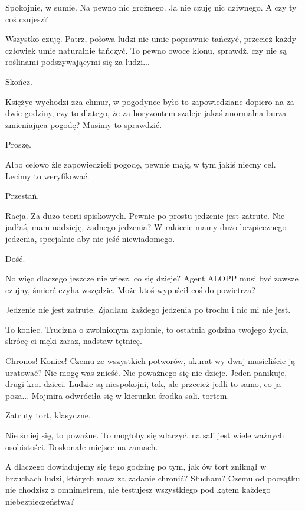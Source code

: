 \ds{} Spokojnie, w sumie. Na pewno nic groźnego. Ja nie czuję nic dziwnego. A czy ty coś czujesz? \de{}

\ds{} Wszystko czuję. Patrz, połowa ludzi nie umie poprawnie tańczyć, przecież każdy człowiek umie naturalnie tańczyć.
To pewno owoce klonu, sprawdź, czy nie są roślinami podszywającymi się za ludzi... \de{}

\ds{} Skończ. \de{}

\ds{} Księżyc wychodzi zza chmur, w pogodynce było to zapowiedziane dopiero na za dwie godziny, czy to dlatego, że za horyzontem szaleje jakaś anormalna burza zmieniająca pogodę? Musimy to sprawdzić. \de{}

\ds{} Proszę. \de{}

\ds{} Albo celowo źle zapowiedzieli pogodę, pewnie mają w tym jakiś niecny cel. Lecimy to weryfikować. \de{}

\ds{} Przestań. \de{}

\ds{} Racja. Za dużo teorii spiskowych. Pewnie po prostu jedzenie jest zatrute. Nie jadłaś, mam nadzieję, żadnego jedzenia? 
W rakiecie mamy dużo bezpiecznego jedzenia, specjalnie aby nie jeść niewiadomego. \de{}

\ds{} Dość. 

\ds{} No więc dlaczego jeszcze nie wiesz, co się dzieje? 
Agent ALOPP musi być zawsze czujny, śmierć czyha wszędzie. Może ktoś wypuścił coś do powietrza? \de{}

\ds{} Jedzenie nie jest zatrute. Zjadłam każdego jedzenia po trochu i nic mi nie jest. \de{}

\ds{} To koniec. Trucizna o zwolnionym zapłonie, to ostatnia godzina twojego życia, skrócę ci męki zaraz, nadstaw tętnicę. \de{}

\ds{} Chronos! Koniec! Czemu ze wszystkich potworów, akurat wy dwaj musieliście ją uratować? Nie mogę was znieść. Nic poważnego się nie dzieje. 
Jeden panikuje, drugi kroi dzieci.
Ludzie są niespokojni, tak, ale przecież jedli to samo, co ja poza...
\dm{} Mojmira odwróciła się w kierunku środka sali. \dm{} tortem. \de{}

\ds{} Zatruty tort, klasyczne. \de{}

\ds{} Nie śmiej się, to poważne. To mogłoby się zdarzyć, na sali jest wiele ważnych osobistości. Doskonałe miejsce na zamach. \de{}

\ds{} A dlaczego dowiadujemy się tego godzinę po tym, jak ów tort zniknął w brzuchach ludzi, których masz za zadanie chronić? Słucham? 
Czemu od początku nie chodzisz z omnimetrem, nie testujesz wszystkiego pod kątem każdego niebezpieczeństwa? \de{}

